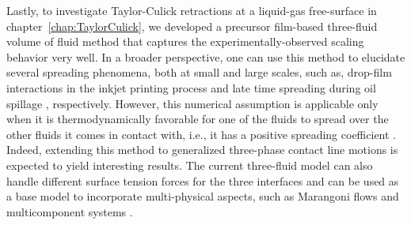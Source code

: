 Lastly, to investigate Taylor-Culick retractions at a liquid-gas free-surface in chapter~\ref{chap:TaylorCulick}, we developed a precursor film-based three-fluid volume of fluid method that captures the experimentally-observed scaling behavior very well. In a broader perspective, one can use this method to elucidate several spreading phenomena, both at small and large scales, such as, drop-film interactions in the inkjet printing process \citep{lohse2022fundamental} and late time spreading during oil spillage \citep{hoult1972oil}, respectively. However, this numerical assumption is applicable only when it is thermodynamically favorable for one of the fluids to spread over the other fluids it comes in contact with, i.e., it has a positive spreading coefficient \citep{book-degennes, berthier2012physics}. Indeed, extending this method to generalized three-phase contact line motions is expected to yield interesting results. The current three-fluid model can also handle different surface tension forces for the three interfaces and can be used as a base model to incorporate multi-physical aspects, such as Marangoni flows and multicomponent systems \citep{lohse2020physicochemical}.
